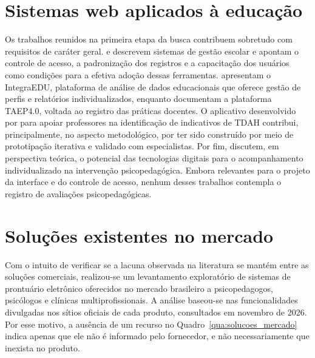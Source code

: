 \section{Sistemas web aplicados à educação}\label{sec:estudos_educacao}

Os trabalhos reunidos na primeira etapa da busca contribuem sobretudo com requisitos de caráter geral.  e  descrevem sistemas de gestão escolar e apontam o controle de acesso, a padronização dos registros e a capacitação dos usuários como condições para a efetiva adoção dessas ferramentas.  apresentam o IntegraEDU, plataforma de análise de dados educacionais que oferece gestão de perfis e relatórios individualizados, enquanto  documentam a plataforma TAEP4.0, voltada ao registro das práticas docentes. O aplicativo desenvolvido por  para apoiar professores na identificação de indicativos de TDAH contribui, principalmente, no aspecto metodológico, por ter sido construído por meio de prototipação iterativa e validado com especialistas. Por fim,  discutem, em perspectiva teórica, o potencial das tecnologias digitais para o acompanhamento individualizado na intervenção psicopedagógica. Embora relevantes para o projeto da interface e do controle de acesso, nenhum desses trabalhos contempla o registro de avaliações psicopedagógicas.

\section{Soluções existentes no mercado}\label{sec:solucoes_mercado}

Com o intuito de verificar se a lacuna observada na literatura se mantém entre as soluções comerciais, realizou-se um levantamento exploratório de sistemas de prontuário eletrônico oferecidos no mercado brasileiro a psicopedagogos, psicólogos e clínicas multiprofissionais. A análise baseou-se nas funcionalidades divulgadas nos sítios oficiais de cada produto, consultados em novembro de 2026. Por esse motivo, a ausência de um recurso no Quadro~\ref{qua:solucoes_mercado} indica apenas que ele não é informado pelo fornecedor, e não necessariamente que inexista no produto.

